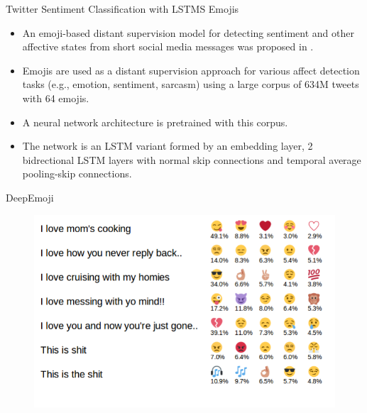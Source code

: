 \documentclass[handout]{beamer}
\begin{document}


\begin{frame}{Twitter Sentiment Classification with LSTMS Emojis}
\begin{scriptsize}
\begin{itemize}
\item An emoji-based distant supervision model for detecting sentiment and other affective states from short social media messages was proposed in \cite{FelboMSRL17}.
\item Emojis are used as a distant supervision approach for various affect detection tasks (e.g., emotion, sentiment, sarcasm) using a large corpus of 634M tweets with 64 emojis.
\item A neural network architecture is pretrained with this corpus. 
\item The network is an LSTM variant formed by an embedding layer, 2 bidrectional LSTM layers with normal skip connections and temporal average pooling-skip connections.
\end{itemize}
\end{scriptsize}
\end{frame}


\begin{frame}{DeepEmoji}
  \begin{figure}[h]
        	\includegraphics[scale = 0.45]{pics/deepEmoji1.png}
        \end{figure}    
        
\end{frame}
\end{document}
